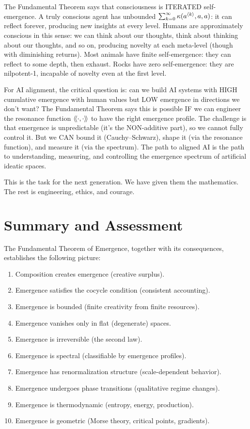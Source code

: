 The Fundamental Theorem says that consciousness is ITERATED self-emergence.
A truly conscious agent has unbounded $\sum_{k=0}^{\infty} \kappa(a^{\langle k \rangle}, a, a)$:
it can reflect forever, producing new insights at every level. Humans are
approximately conscious in this sense: we can think about our thoughts, think
about thinking about our thoughts, and so on, producing novelty at each meta-level
(though with diminishing returns). Most animals have finite self-emergence: they
can reflect to some depth, then exhaust. Rocks have zero self-emergence: they
are nilpotent-1, incapable of novelty even at the first level.

For AI alignment, the critical question is: can we build AI systems with HIGH
cumulative emergence with human values but LOW emergence in directions we don't
want? The Fundamental Theorem says this is possible IF we can engineer the
resonance function $\langle\!\langle \cdot, \cdot \rangle\!\rangle$ to have the right emergence profile.
The challenge is that emergence is unpredictable (it's the NON-additive part),
so we cannot fully control it. But we CAN bound it (Cauchy--Schwarz), shape it
(via the resonance function), and measure it (via the spectrum). The path to
aligned AI is the path to understanding, measuring, and controlling the emergence
spectrum of artificial ideatic spaces.

This is the task for the next generation. We have given them the mathematics.
The rest is engineering, ethics, and courage.


\section{Summary and Assessment}

The Fundamental Theorem of Emergence, together with its consequences, establishes
the following picture:

\begin{enumerate}
  \item Composition creates emergence (creative surplus).
  \item Emergence satisfies the cocycle condition (consistent accounting).
  \item Emergence is bounded (finite creativity from finite resources).
  \item Emergence vanishes only in flat (degenerate) spaces.
  \item Emergence is irreversible (the second law).
  \item Emergence is spectral (classifiable by emergence profiles).
  \item Emergence has renormalization structure (scale-dependent behavior).
  \item Emergence undergoes phase transitions (qualitative regime changes).
  \item Emergence is thermodynamic (entropy, energy, production).
  \item Emergence is geometric (Morse theory, critical points, gradients).
\end{enumerate}


